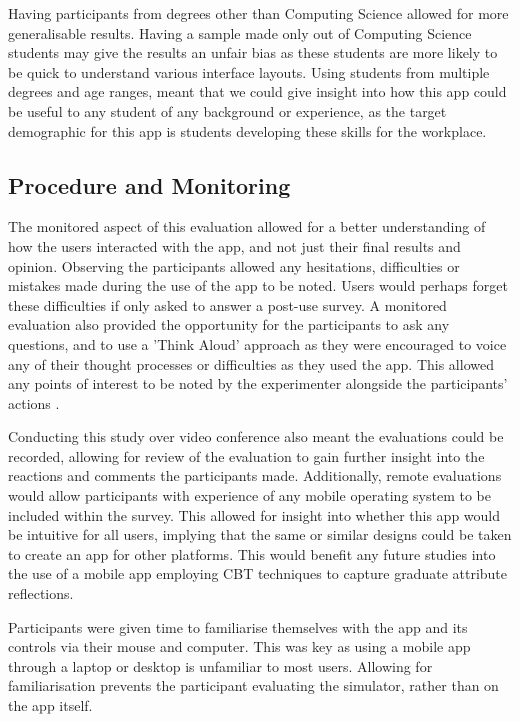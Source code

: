 \documentclass{l4proj}
\begin{document}
Having participants from degrees other than Computing Science allowed for more generalisable results. Having a sample made only out of Computing Science students may give the results an unfair bias as these students are more likely to be quick to understand various interface layouts. Using students from multiple degrees and age ranges, meant that we could give insight into how this app could be useful to any student of any background or experience, as the target demographic for this app is students developing these skills for the workplace.

\subsection{Procedure and Monitoring}

The monitored aspect of this evaluation allowed for a better understanding of how the users interacted with the app, and not just their final results and opinion. Observing the participants allowed any hesitations, difficulties or mistakes made during the use of the app to be noted. Users would perhaps forget these difficulties if only asked to answer a post-use survey. A monitored evaluation also provided the opportunity for the participants to ask any questions, and to use a 'Think Aloud' approach as they were encouraged to voice any of their thought processes or difficulties as they used the app. This allowed any points of interest to be noted by the experimenter alongside the participants’ actions \citep{lewis_task-centered_1994}.

Conducting this study over video conference also meant the evaluations could be recorded, allowing for review of the evaluation to gain further insight into the reactions and comments the participants made. Additionally, remote evaluations would allow participants with experience of any mobile operating system to be included within the survey. This allowed for insight into whether this app would be intuitive for all users, implying that the same or similar designs could be taken to create an app for other platforms. This would benefit any future studies into the use of a mobile app employing CBT techniques to capture graduate attribute reflections. 
 
Participants were given time to familiarise themselves with the app and its controls via their mouse and computer. This was key as using a mobile app through a laptop or desktop is unfamiliar to most users. Allowing for familiarisation prevents the participant evaluating the simulator, rather than on the app itself. 
 
\end{document}
